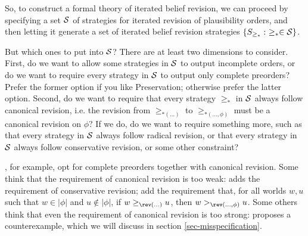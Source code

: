 So, to construct a formal theory of iterated belief revision, we can proceed by specifying a set ${\cal S}$ of strategies for iterated revision of plausibility orders, and then letting it generate a set of iterated belief revision strategies $\{S_{\ge_*} : \,\, \ge_* \in {\cal S} \}$.

But which ones to put into $\cal S$? There are at least two dimensions to consider. First, do we want to allow some strategies in $\cal S$ to output incomplete orders, or do we want to require every strategy in $\cal S$ to output only complete preorders? Prefer the former option if you like Preservation; otherwise prefer the latter option. Second, do we want to require that every strategy $\ge_{*}$ in $\cal S$ always follow canonical revision, i.e. the revision from $\ge_{*(\ldots)}$ to $\ge_{*(\ldots, \phi)}$ must be a canonical revision on $\phi$? If we do, do we want to require something more, such as that every strategy in $\cal S$ always follow radical revision, or that every strategy in $\cal S$ always follow conservative revision, or some other constraint? 

\citet{darwiche1997logic}, for example, opt for complete preorders together with canonical revision. Some think that the requirement of canonical revision is too weak: \citet{boutilier1996iterated} adds the requirement of conservative revision; \citet{jin2007iterated} add the requirement that, for all worlds $w, u$ such that $w \in |\phi|$ and $u \not\in |\phi|$, if $w \ge_{\rev(\ldots)} u$, then $w >_{\rev(\ldots, \phi)} u$. Some others think that even the requirement of canonical revision is too strong: \citet{stalnaker2009iterated} proposes a counterexample, which we will discuss in section \ref{sec-misspecification}. 



